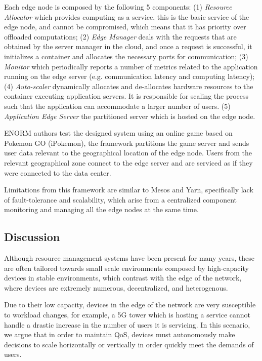 Each edge node is composed by the following 5 components: (1) \textit{Resource Allocator} which provides computing as a service, this is the basic service of the edge node, and cannot be compromised, which means that it has priority over offloaded computations; (2) \textit{Edge Manager} deals with the requests that are obtained by the server manager in the cloud, and once a request is successful, it initializes a container and allocates the necessary ports for communication; (3) \textit{Monitor} which periodically reports a number of metrics related to the application running on the edge server (e.g. communication latency and computing latency); (4) \textit{Auto-scaler} dynamically allocates and de-allocates hardware resources to the container executing application servers. It is responsible for scaling the process such that the application can accommodate a larger number of users. (5) \textit{Application Edge Server} the partitioned server which is hosted on the edge node.

ENORM authors test the designed system using an online game based on Pokemon GO (iPokemon)\cite{pokemonGo}, the framework partitions the game server and sends  user data relevant to the geographical location of the edge node. Users from the relevant geographical zone connect to the edge server and are serviced as if they were connected to the data center. 

Limitations from this framework are similar to Mesos and Yarn, specifically lack of fault-tolerance and scalability, which arise from a centralized component monitoring and managing all the edge nodes at the same time. 

\subsection{Discussion}

Although resource management systems have been present for many years, these are often tailored towards small scale environments composed by high-capacity devices in stable environments, which contrast with the edge of the network, where devices are extremely numerous, decentralized, and heterogenous.

Due to their low capacity, devices in the edge of the network are very susceptible to workload changes, for example, a 5G tower which is hosting a service cannot handle a drastic increase in the number of users it is servicing. In this scenario, we argue that in order to maintain QoS, devices must autonomously make decisions to scale horizontally or vertically in order quickly meet the demands of users.

